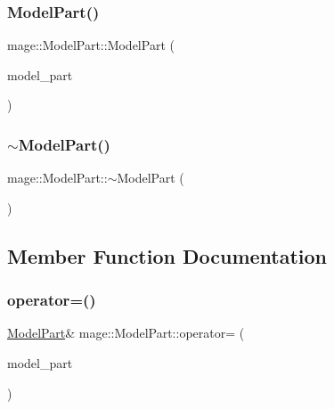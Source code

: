 \hypertarget{structmage_1_1_model_part_a3c39c2c312f07687f8ad5c2c2580d1e2}{}\label{structmage_1_1_model_part_a3c39c2c312f07687f8ad5c2c2580d1e2} 
\subsubsection{\texorpdfstring{Model\+Part()}{ModelPart()}\hspace{0.1cm}{\footnotesize\ttfamily [2/2]}}
{\footnotesize\ttfamily mage\+::\+Model\+Part\+::\+Model\+Part (\begin{DoxyParamCaption}\item[{const \hyperlink{structmage_1_1_model_part}{Model\+Part} \&}]{model\+\_\+part }\end{DoxyParamCaption})\hspace{0.3cm}{\ttfamily [default]}}

\hypertarget{structmage_1_1_model_part_a3322c5c7924ec30be170ae1ed6dca550}{}\label{structmage_1_1_model_part_a3322c5c7924ec30be170ae1ed6dca550} 
\subsubsection{\texorpdfstring{$\sim$\+Model\+Part()}{~ModelPart()}}
{\footnotesize\ttfamily mage\+::\+Model\+Part\+::$\sim$\+Model\+Part (\begin{DoxyParamCaption}{ }\end{DoxyParamCaption})\hspace{0.3cm}{\ttfamily [default]}}



\subsection{Member Function Documentation}
\hypertarget{structmage_1_1_model_part_a00cbb00c174bdd27879b67d54185d748}{}\label{structmage_1_1_model_part_a00cbb00c174bdd27879b67d54185d748} 
\subsubsection{\texorpdfstring{operator=()}{operator=()}}
{\footnotesize\ttfamily \hyperlink{structmage_1_1_model_part}{Model\+Part}\& mage\+::\+Model\+Part\+::operator= (\begin{DoxyParamCaption}\item[{\hyperlink{structmage_1_1_model_part}{Model\+Part} \&}]{model\+\_\+part }\end{DoxyParamCaption})\hspace{0.3cm}{\ttfamily [default]}}



